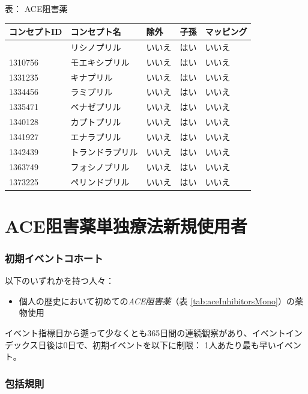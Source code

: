 \documentclass[
  11pt]{book}
\providecommand{\tightlist}{%
  \setlength{\itemsep}{0pt}\setlength{\parskip}{0pt}}
\theoremstyle{definition}
\theoremstyle{definition}
\theoremstyle{definition}
\theoremstyle{definition}
\theoremstyle{remark}
\begin{document}
表： \label{tab:aceInhibitors} ACE阻害薬

\begin{longtable}[]{@{}lllll@{}}
\toprule\noalign{}
コンセプトID & コンセプト名 & 除外 & 子孫 & マッピング \\
\midrule\noalign{}
\endhead
\bottomrule\noalign{}
\endlastfoot
1308216 & リシノプリル & いいえ & はい & いいえ \\
1310756 & モエキシプリル & いいえ & はい & いいえ \\
1331235 & キナプリル & いいえ & はい & いいえ \\
1334456 & ラミプリル & いいえ & はい & いいえ \\
1335471 & ベナゼプリル & いいえ & はい & いいえ \\
1340128 & カプトプリル & いいえ & はい & いいえ \\
1341927 & エナラプリル & いいえ & はい & いいえ \\
1342439 & トランドラプリル & いいえ & はい & いいえ \\
1363749 & フォシノプリル & いいえ & はい & いいえ \\
1373225 & ペリンドプリル & いいえ & はい & いいえ \\
\end{longtable}

\section{ACE阻害薬単独療法新規使用者}\label{AceInhibitorsMono}

\subsubsection*{初期イベントコホート}\label{ux521dux671fux30a4ux30d9ux30f3ux30c8ux30b3ux30dbux30fcux30c8-1}

以下のいずれかを持つ人々：

\begin{itemize}
\tightlist
\item
  個人の歴史において初めての\emph{ACE阻害薬}（表 \ref{tab:aceInhibitorsMono}）の薬物使用
\end{itemize}

イベント指標日から遡って少なくとも365日間の連続観察があり、イベントインデックス日後は0日で、初期イベントを以下に制限： 1人あたり最も早いイベント。

\subsubsection*{包括規則}\label{ux5305ux62ecux898fux5247}
\end{document}
